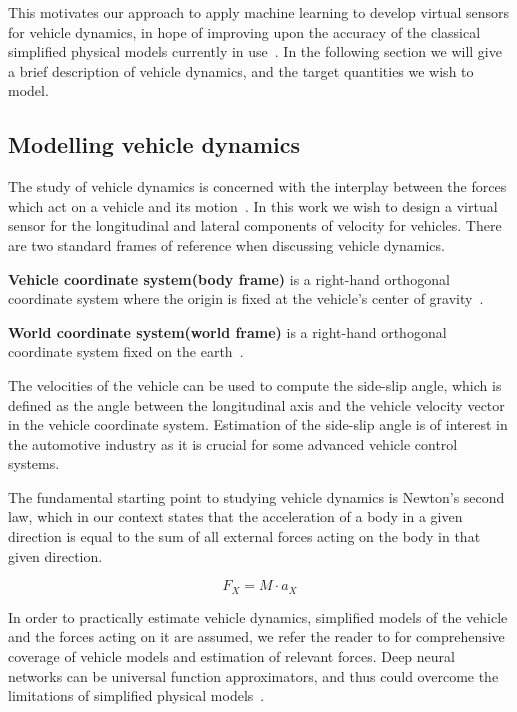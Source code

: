 \documentclass[../main.tex]{subfiles}
\begin{document}
This motivates our approach to apply machine learning to develop virtual sensors for vehicle dynamics, in hope of improving upon the accuracy of the classical simplified physical models currently in use~\cite{graber2018hybrid}. In the following section we will give a brief description of vehicle dynamics, and the target quantities we wish to model. 

\subsection{Modelling vehicle dynamics}
\label{sec:vehicle_dynamics}

The study of vehicle dynamics is concerned with the interplay between the forces which act on a vehicle and its motion~\citep{schramm2014vehicle}. In this work we wish to design a virtual sensor for the longitudinal and lateral components of velocity for vehicles. There are two standard frames of reference when discussing vehicle dynamics. 

\textbf{Vehicle coordinate system(body frame)} is a right-hand orthogonal coordinate system where the origin is fixed at the vehicle's center of gravity~\citep{gill2000vehicle}.

\textbf{World coordinate system(world frame)} is a right-hand orthogonal coordinate system fixed on the earth~\citep{gill2000vehicle}.

The velocities of the vehicle can be used to compute the side-slip angle, which is defined as the angle between the longitudinal axis and the vehicle velocity vector in the vehicle coordinate system. Estimation of the side-slip angle is of interest in the automotive industry as it is crucial for some advanced vehicle control systems\citep{jin2017vehicle}. 

The fundamental starting point to studying vehicle dynamics is Newton's second law, which in our context states that the acceleration of a body in a given direction is equal to the sum of all external forces acting on the  body in that given direction. 

\begin{equation}
    F_X = M \cdot a_X
\end{equation}{}

In order to practically estimate vehicle dynamics, simplified models of the vehicle and the forces acting on it are assumed, we refer the reader to \cite{schramm2014vehicle} for comprehensive coverage of vehicle models and estimation of relevant forces. Deep neural networks can be universal function approximators, and thus could overcome the limitations of simplified physical models~\citep{graber2018hybrid}.
\end{document}
